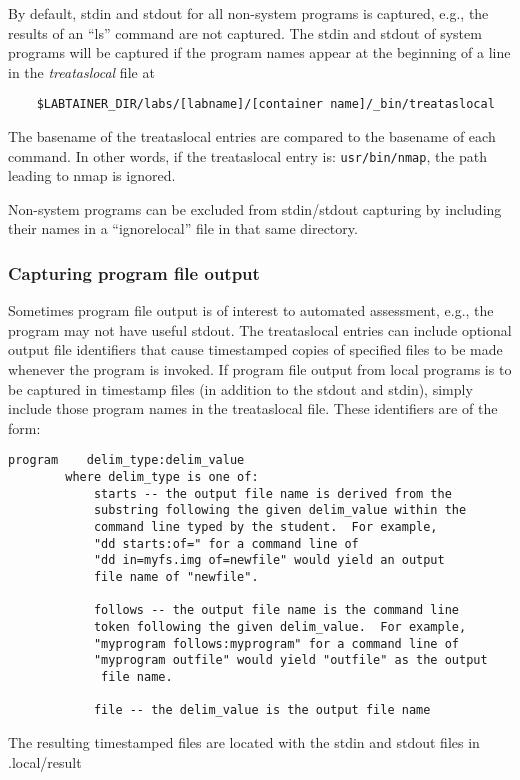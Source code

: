 \documentclass[12pt]{article}
\begin{document}
By default, stdin and stdout for all non-system programs is captured, e.g., the results of an ``ls'' command
are not captured.  The stdin and stdout of system programs will be captured if the program
names appear at the beginning of a line in the \textit{treataslocal} file at
\begin{verbatim}
    $LABTAINER_DIR/labs/[labname]/[container name]/_bin/treataslocal
\end{verbatim}
\noindent The basename of the treataslocal entries are compared to the basename of each command.
In other words, if the treataslocal entry is: \texttt{usr/bin/nmap}, the path leading to nmap is ignored.

Non-system programs can be excluded from stdin/stdout capturing by including their names in
a ``ignorelocal'' file in that same directory.

\subsubsection{Capturing program file output}
Sometimes program file output is of interest to automated assessment, e.g., the program
may not have useful stdout.
The treataslocal entries can include optional output file identifiers that
cause timestamped copies of specified files to be made whenever the program is invoked.  
If program file output from local programs is to be captured in timestamp files (in addition
to the stdout and stdin), simply include those program names in the treataslocal file.
These identifiers are of the form:
\begin{verbatim}
program    delim_type:delim_value
        where delim_type is one of:
            starts -- the output file name is derived from the 
            substring following the given delim_value within the 
            command line typed by the student.  For example, 
            "dd starts:of=" for a command line of 
            "dd in=myfs.img of=newfile" would yield an output 
            file name of "newfile".
     
            follows -- the output file name is the command line 
            token following the given delim_value.  For example, 
            "myprogram follows:myprogram" for a command line of
            "myprogram outfile" would yield "outfile" as the output 
             file name.

            file -- the delim_value is the output file name
\end{verbatim}
\noindent The resulting timestamped files are located with the stdin and stdout files in .local/result
\end{document}
